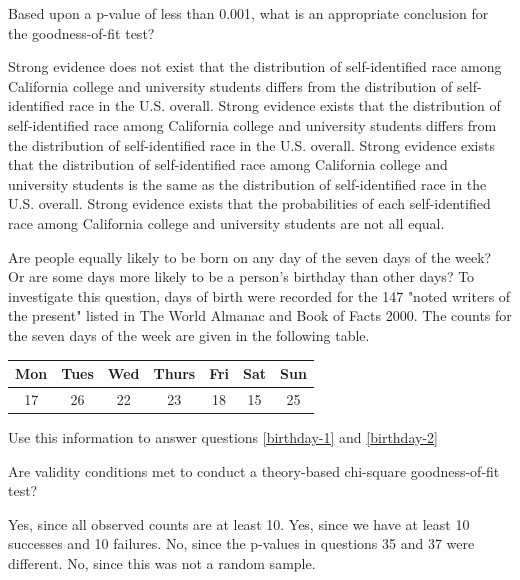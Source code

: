 \documentclass{article}
\begin{document}
\begin{mcquestions}
		\question[follow] Based upon a p-value of less than 0.001, what is an appropriate conclusion for the goodness-of-fit test? \label{census-2}
		\begin{mcanswerslist}
			\answer  Strong evidence does not exist that the distribution of self-identified race among California college and university students differs from the distribution of self-identified race in the U.S. overall.
			\answer[correct]  Strong evidence exists that the distribution of self-identified race among California college and university students differs from the distribution of self-identified race in the U.S. overall.
			\answer  Strong evidence exists that the distribution of self-identified race among California college and university students is the same as the distribution of self-identified race in the U.S. overall.
			\answer  Strong evidence exists that the probabilities of each self-identified race among California college and university students are not all equal.
		\end{mcanswerslist}
		
		\begin{mcquestioninstruction}
			Are people equally likely to be born on any day of the seven days of the week? Or are some days more likely to be a person's birthday than other days?  To investigate this question, days of birth were recorded for the 147 "noted writers of the present" listed in The World Almanac and Book of Facts 2000. The counts for the seven days of the week are given in the following table.
			\begin{center}
				\begin{tabular}{ccccccc}
					Mon&Tues&Wed&Thurs&Fri&Sat&Sun\\ \hline
					17&26&22&23&18&15&25					
				\end{tabular}
			\end{center}
			Use this information to answer questions \ref{birthday-1} and \ref{birthday-2}
		\end{mcquestioninstruction}
		\question Are validity conditions met to conduct a theory-based chi-square goodness-of-fit test? \label{birthday-1}
		\begin{mcanswerslist}
			\answer[correct]  Yes, since all observed counts are at least 10.
			\answer  Yes, since we have at least 10 successes and 10 failures.
			\answer  No, since the p-values in questions 35 and 37 were different.
			\answer  No, since this was not a random sample.
		\end{mcanswerslist}
		

\end{mcquestions}
\end{document}
